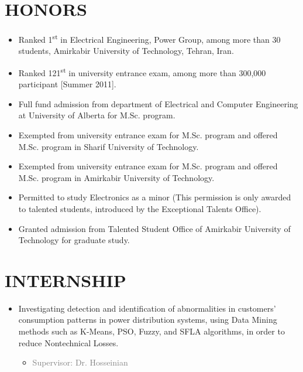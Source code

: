 \documentclass[10pt,a4paper,sans]{moderncv} %
\begin{document}
\section{HONORS}

\begin{itemize}
\item Ranked 1\textsuperscript{st} in Electrical Engineering, Power Group, among more than 30 students,
Amirkabir University of Technology, Tehran, Iran.

\item Ranked 121\textsuperscript{st} in university entrance exam, among more than 300,000
participant [Summer 2011].

\item Full fund admission from department of Electrical and Computer Engineering at University of Alberta for M.Sc. program.

\item Exempted from university entrance exam for M.Sc. program and offered M.Sc. program in
Sharif University of Technology.

\item Exempted from university entrance exam for M.Sc. program and offered M.Sc. program in
Amirkabir University of Technology.

\item Permitted to study Electronics as a minor (This permission is only awarded to talented students, introduced by the Exceptional Talents Office).

\item Granted admission from Talented Student Office of Amirkabir University of Technology for graduate study. \\
\end{itemize}

\vspace{-1 em}
\section{INTERNSHIP}
\begin{itemize}
\item Investigating detection and identification of abnormalities in customers' consumption patterns in power distribution systems, using Data Mining methods such as K-Means, PSO, Fuzzy, and SFLA algorithms, in order to reduce Nontechnical Losses.
\begin{itemize} 
\item\textcolor{gray}{Supervisor: Dr. Hosseinian} 
\end{itemize}
\end{itemize}
\end{document}
